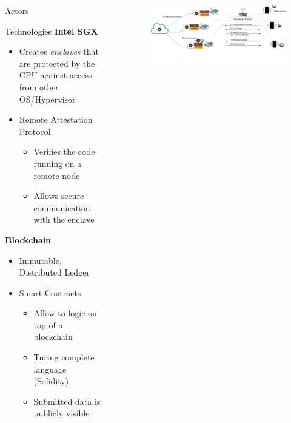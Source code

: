 \documentclass[final]{beamer}
\newlength{\sepwid}
\newlength{\onecolwid}
\newlength{\twocolwid}
\begin{document}
\begin{frame}[t]
\begin{columns}[t]
\begin{column}{\onecolwid}
\begin{block}{Actors}
\end{block}




\begin{block}{Technologies}
\textbf{Intel SGX}
  \begin{itemize}
    \item Creates \emph{enclaves} that are protected by the CPU against access from other OS/Hypervisor
    \item Remote Attestation Protocol
    \begin{itemize}
      \item Verifies the code running on a remote node
      \item Allows secure communication with the enclave
    \end{itemize}
  \end{itemize}
  
\textbf{Blockchain}
  \begin{itemize}
  \item Immutable, Distributed Ledger
  \item Smart Contracts
    \begin{itemize}
      \item Allow to logic on top of a blockchain
      \item Turing complete language (Solidity)
      \item Submitted data is publicly visible
    \end{itemize}
  \end{itemize}
\end{block}


\end{column} %

\begin{column}{\sepwid}\end{column} %

\begin{column}{\twocolwid} %

\begin{figure}
\includegraphics[width=1\linewidth]{img/scenario}
\end{figure}


\end{column}
\end{columns}
\end{frame}
\end{document}
